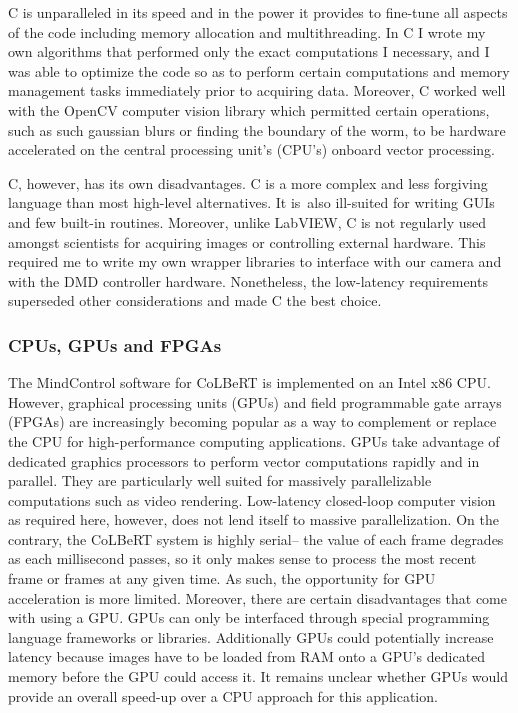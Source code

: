 C is unparalleled in its speed and in the power it provides to fine-tune all aspects of the code including memory allocation and multithreading. In C I wrote my own algorithms that performed only the exact computations I necessary, and I was able to optimize the code so as to perform certain computations and memory management tasks immediately prior to acquiring data. Moreover, C worked well with the OpenCV computer vision library \citep{bradski_opencv_2000,bradski_learning_2008} which permitted certain operations, such as such gaussian blurs or finding the boundary of the worm, to be hardware accelerated on the central processing unit's (CPU's) onboard vector processing. 

C, however, has its own disadvantages. C is a more complex and less forgiving language than most high-level alternatives. It is also ill-suited for writing GUIs and few built-in routines. Moreover, unlike LabVIEW, C is not regularly used amongst scientists for acquiring images or controlling external hardware. This required me to write my own wrapper libraries to interface with our camera  and with the DMD controller hardware. Nonetheless, the low-latency requirements superseded other considerations and made C the best choice. 

\subsubsection{CPUs, GPUs and FPGAs}
The MindControl software for CoLBeRT is implemented on an Intel x86 CPU. However, graphical processing units (GPUs) and field programmable gate arrays (FPGAs) are increasingly becoming popular as a way to complement or replace the CPU for high-performance computing applications.  GPUs take advantage of dedicated graphics processors to perform vector computations rapidly and in parallel. They are particularly well suited for massively parallelizable computations such as video rendering. Low-latency closed-loop computer vision as required here, however, does not lend itself to massive parallelization. On the contrary, the CoLBeRT system is highly serial-- the value of each frame degrades as each millisecond passes, so it only makes sense to process the most recent frame or frames at any given time. As such, the opportunity for GPU acceleration is more limited. Moreover, there are certain disadvantages that come with using a GPU. GPUs can only be interfaced through special  programming language frameworks or libraries. Additionally GPUs could potentially increase latency because images have to be loaded from RAM onto a GPU's dedicated memory before the  GPU could access it. It remains unclear whether GPUs would provide an overall speed-up over a CPU approach for this application. 


